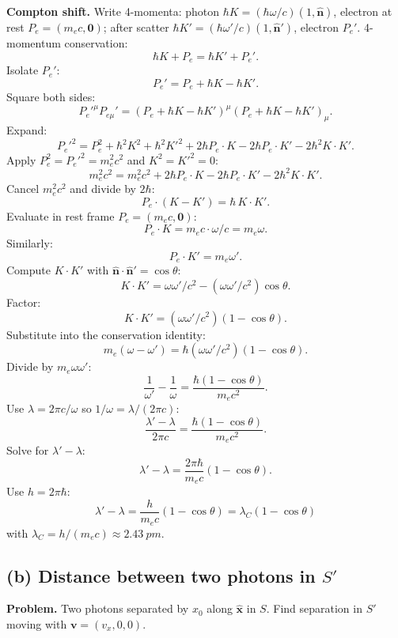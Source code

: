 \documentclass[11pt]{article}
\begin{document}
\noindent\textbf{Compton shift.} Write 4-momenta: photon $\hbar K = (\hbar\omega/c)(1,\hat{\bm n})$, electron at rest $P_e=(m_e c,\bm 0)$; after scatter $\hbar K'=(\hbar\omega'/c)(1,\hat{\bm n}')$, electron $P_e'$. 4-momentum conservation:
\[ \hbar K + P_e = \hbar K' + P_e'. \]
Isolate $P_e'$:
\[ P_e' = P_e + \hbar K - \hbar K'. \]
Square both sides:
\[ P_e'^\mu P_{e\mu}' = (P_e + \hbar K - \hbar K')^\mu (P_e+\hbar K-\hbar K')_\mu. \]
Expand:
\[ P_e'^2 = P_e^2 + \hbar^2 K^2 + \hbar^2 K'^2 + 2\hbar P_e\!\cdot\!K - 2\hbar P_e\!\cdot\!K' - 2\hbar^2 K\!\cdot\!K'. \]
Apply $P_e^2 = P_e'^2 = m_e^2 c^2$ and $K^2=K'^2=0$:
\[ m_e^2 c^2 = m_e^2 c^2 + 2\hbar P_e\!\cdot\!K - 2\hbar P_e\!\cdot\!K' - 2\hbar^2 K\!\cdot\!K'. \]
Cancel $m_e^2 c^2$ and divide by $2\hbar$:
\[ P_e\!\cdot\!(K-K') = \hbar\, K\!\cdot\!K'. \]
Evaluate in rest frame $P_e=(m_e c,\bm 0)$:
\[ P_e\!\cdot\!K = m_e c\cdot \omega/c = m_e\omega. \]
Similarly:
\[ P_e\!\cdot\!K' = m_e\omega'. \]
Compute $K\!\cdot\!K'$ with $\hat{\bm n}\!\cdot\!\hat{\bm n}'=\cos\theta$:
\[ K\!\cdot\!K' = \omega\omega'/c^2 - (\omega\omega'/c^2)\cos\theta. \]
Factor:
\[ K\!\cdot\!K' = (\omega\omega'/c^2)(1-\cos\theta). \]
Substitute into the conservation identity:
\[ m_e(\omega-\omega') = \hbar(\omega\omega'/c^2)(1-\cos\theta). \]
Divide by $m_e\omega\omega'$:
\[ \frac{1}{\omega'}-\frac{1}{\omega} = \frac{\hbar(1-\cos\theta)}{m_e c^2}. \]
Use $\lambda = 2\pi c/\omega$ so $1/\omega = \lambda/(2\pi c)$:
\[ \frac{\lambda'-\lambda}{2\pi c} = \frac{\hbar(1-\cos\theta)}{m_e c^2}. \]
Solve for $\lambda'-\lambda$:
\[ \lambda'-\lambda = \frac{2\pi\hbar}{m_e c}(1-\cos\theta). \]
Use $h = 2\pi\hbar$:
\[ \boxed{\;\lambda' - \lambda = \frac{h}{m_e c}(1-\cos\theta) = \lambda_C(1-\cos\theta)\;} \]
with $\lambda_C = h/(m_e c) \approx \SI{2.43}{pm}$.

\subsection*{(b) Distance between two photons in $S'$}

\textbf{Problem.} Two photons separated by $x_0$ along $\hat{\bm x}$ in $S$. Find separation in $S'$ moving with $\bm v=(v_x,0,0)$.
\end{document}
